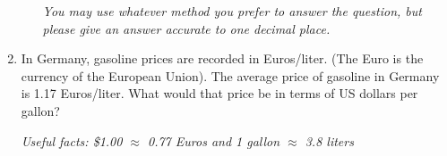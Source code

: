 \documentclass[12pt]{article}
\begin{document}
\begin{enumerate}
\begin{enumerate}
\emph{You may use whatever method you prefer to answer the question, but please give an answer accurate to one decimal place.}
\vfill

\end{enumerate}

\noindent \hrulefill
\item In Germany, gasoline prices are recorded in Euros/liter.  (The Euro is the currency of the European Union).  The average price of gasoline in Germany is 1.17 Euros/liter.  What would that price be in terms of US dollars per gallon?

\emph{Useful facts:  \$1.00 $\approx$ 0.77 Euros and 1 gallon $\approx$ 3.8 liters }
\vfill


\end{enumerate}




\newpage
\end{document}
